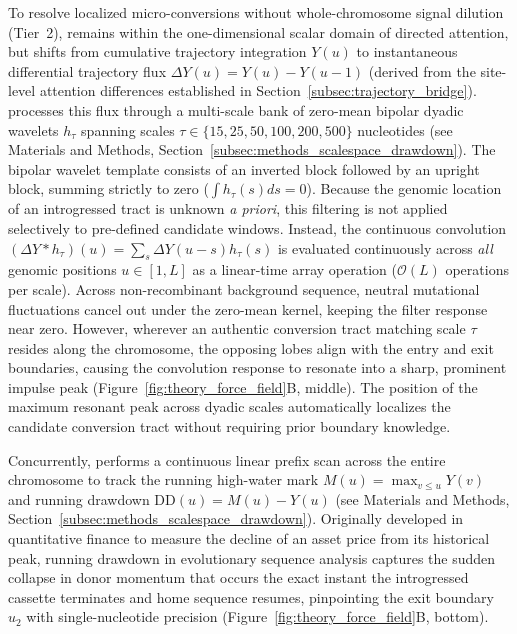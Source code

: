 To resolve localized micro-conversions without whole-chromosome signal dilution (Tier~2), \RhizAeon remains within the one-dimensional scalar domain of directed attention, but shifts from cumulative trajectory integration $Y(u)$ to instantaneous differential trajectory flux $\Delta Y(u) = Y(u) - Y(u-1)$ (derived from the site-level attention differences established in Section~\ref{subsec:trajectory_bridge}).
\RhizAeon processes this flux through a multi-scale bank of zero-mean bipolar dyadic wavelets $h_\tau$ spanning scales $\tau \in \{15, 25, 50, 100, 200, 500\}$ nucleotides (see Materials and Methods, Section~\ref{subsec:methods_scalespace_drawdown}).
The bipolar wavelet template consists of an inverted block followed by an upright block, summing strictly to zero ($\int h_\tau(s) ds = 0$).
Because the genomic location of an introgressed tract is unknown \textit{a priori}, this filtering is not applied selectively to pre-defined candidate windows. Instead, the continuous convolution $(\Delta Y * h_\tau)(u) = \sum_s \Delta Y(u - s) h_\tau(s)$ is evaluated continuously across \textit{all} genomic positions $u \in [1, L]$ as a linear-time array operation ($\mathcal{O}(L)$ operations per scale).
Across non-recombinant background sequence, neutral mutational fluctuations cancel out under the zero-mean kernel, keeping the filter response near zero.
However, wherever an authentic conversion tract matching scale $\tau$ resides along the chromosome, the opposing lobes align with the entry and exit boundaries, causing the convolution response to resonate into a sharp, prominent impulse peak (Figure~\ref{fig:theory_force_field}B, middle).
The position of the maximum resonant peak across dyadic scales automatically localizes the candidate conversion tract without requiring prior boundary knowledge.

Concurrently, \RhizAeon performs a continuous linear prefix scan across the entire chromosome to track the running high-water mark $M(u) = \max_{v \le u} Y(v)$ and running drawdown $\text{DD}(u) = M(u) - Y(u)$ (see Materials and Methods, Section~\ref{subsec:methods_scalespace_drawdown}).
Originally developed in quantitative finance to measure the decline of an asset price from its historical peak, running drawdown in evolutionary sequence analysis captures the sudden collapse in donor momentum that occurs the exact instant the introgressed cassette terminates and home sequence resumes, pinpointing the exit boundary $u_2$ with single-nucleotide precision (Figure~\ref{fig:theory_force_field}B, bottom).

